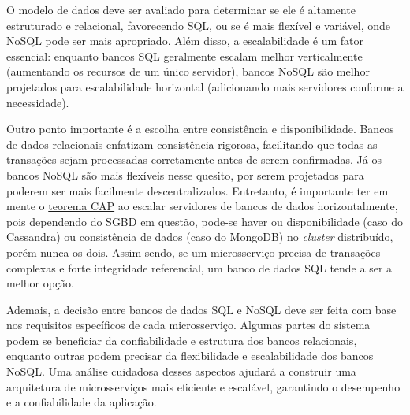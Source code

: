 O modelo de dados deve ser avaliado para determinar se ele é altamente estruturado e relacional, favorecendo SQL, ou se é mais flexível e variável, onde NoSQL pode ser mais apropriado. Além disso, a escalabilidade é um fator essencial: enquanto bancos SQL geralmente escalam melhor verticalmente (aumentando os recursos de um único servidor), bancos NoSQL são melhor projetados para escalabilidade horizontal (adicionando mais servidores conforme a necessidade). 

Outro ponto importante é a escolha entre consistência e disponibilidade. Bancos de dados relacionais enfatizam consistência rigorosa, facilitando que todas as transações sejam processadas corretamente antes de serem confirmadas. Já os bancos NoSQL são mais flexíveis nesse quesito, por serem projetados para poderem ser mais facilmente descentralizados. Entretanto, é importante ter em mente o \hyperref[teorema-cap]{teorema CAP} ao escalar servidores de bancos de dados horizontalmente, pois dependendo do SGBD em questão, pode-se haver ou disponibilidade (caso do Cassandra) ou consistência de dados (caso do MongoDB) no \emph{cluster} distribuído, porém nunca os dois. Assim sendo, se um microsserviço precisa de transações complexas e forte integridade referencial, um banco de dados SQL tende a ser a melhor opção. \cite{ibm-choosing-database,mongodb-sql-nosql}

Ademais, a decisão entre bancos de dados SQL e NoSQL deve ser feita com base nos requisitos específicos de cada microsserviço. Algumas partes do sistema podem se beneficiar da confiabilidade e estrutura dos bancos relacionais, enquanto outras podem precisar da flexibilidade e escalabilidade dos bancos NoSQL. Uma análise cuidadosa desses aspectos ajudará a construir uma arquitetura de microsserviços mais eficiente e escalável, garantindo o desempenho e a confiabilidade da aplicação.


